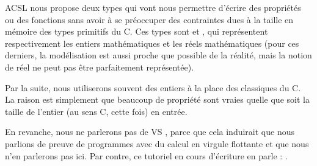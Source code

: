ACSL nous propose deux types qui vont nous permettre d'écrire des propriétés 
ou des fonctions sans avoir à se préoccuper des contraintes dues à la taille en
mémoire des types primitifs du C. Ces types sont  et ,
qui représentent respectivement les entiers mathématiques et les réels 
mathématiques (pour ces derniers, la modélisation est aussi proche que possible 
de la réalité, mais la notion de réel ne peut pas être parfaitement représentée).



Par la suite, nous utiliserons souvent des entiers à la place des classiques 
 du C. La raison est simplement que beaucoup de propriété sont vraies 
quelle que soit la taille de l'entier (au sens C, cette fois) en entrée.



En revanche, nous ne parlerons pas de  VS , parce que 
cela induirait que nous parlions de preuve de programmes avec du calcul en virgule 
flottante et que nous n'en parlerons pas ici. Par contre, ce tutoriel en cours d'écriture en parle : .
